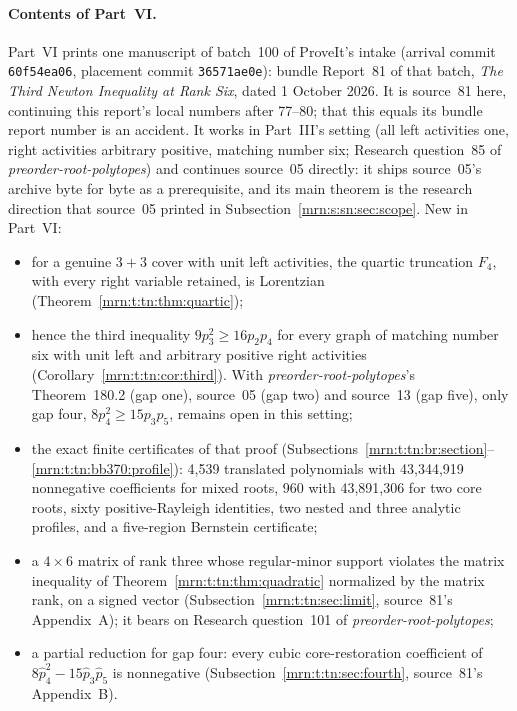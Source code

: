 \documentclass[11pt,a4paper]{article}
\theoremstyle{remark}\newtheorem{remark}[theorem]{Remark}
\newcommand{\prp}{\emph{preorder-root-polytopes}}
\begin{document}
\paragraph{Contents of Part~VI.}
Part~VI prints one manuscript of batch~100 of ProveIt's intake (arrival
commit \texttt{60f54ea06}, placement commit \texttt{36571ae0e}): bundle
Report~81 of that batch, \emph{The Third Newton Inequality at Rank Six},
dated 1 October 2026. It is source~81 here, continuing this report's local
numbers after 77--80; that this equals its bundle report number is an
accident. It works in Part~III's setting (all left activities one, right
activities arbitrary positive, matching number six; Research question~85 of
\prp) and continues source~05 directly: it ships source~05's archive byte for
byte as a prerequisite, and its main theorem is the research direction that
source~05 printed in Subsection~\ref{mrn:s:sn:sec:scope}. New in Part~VI:
\begin{itemize}
\item for a genuine $3+3$ cover with unit left activities, the quartic
  truncation $F_4$, with every right variable retained, is Lorentzian
  (Theorem~\ref{mrn:t:tn:thm:quartic});
\item hence the third inequality $9p_3^2\ge16p_2p_4$ for every graph of
  matching number six with unit left and arbitrary positive right activities
  (Corollary~\ref{mrn:t:tn:cor:third}). With \prp's Theorem~180.2 (gap one),
  source~05 (gap two) and source~13 (gap five), only gap four,
  $8p_4^2\ge15p_3p_5$, remains open in this setting;
\item the exact finite certificates of that proof
  (Subsections~\ref{mrn:t:tn:br:section}--\ref{mrn:t:tn:bb370:profile}):
  4,539 translated polynomials with 43,344,919 nonnegative coefficients for
  mixed roots, 960 with 43,891,306 for two core roots, sixty positive-Rayleigh
  identities, two nested and three analytic profiles, and a five-region
  Bernstein certificate;
\item a $4\times6$ matrix of rank three whose regular-minor support violates
  the matrix inequality of Theorem~\ref{mrn:t:tn:thm:quadratic} normalized by
  the matrix rank, on a signed vector (Subsection~\ref{mrn:t:tn:sec:limit},
  source~81's Appendix~A); it bears on Research question~101 of \prp;
\item a partial reduction for gap four: every cubic core-restoration
  coefficient of $8\widehat p_4^2-15\widehat p_3\widehat p_5$ is nonnegative
  (Subsection~\ref{mrn:t:tn:sec:fourth}, source~81's Appendix~B).
\end{itemize}
\end{document}
